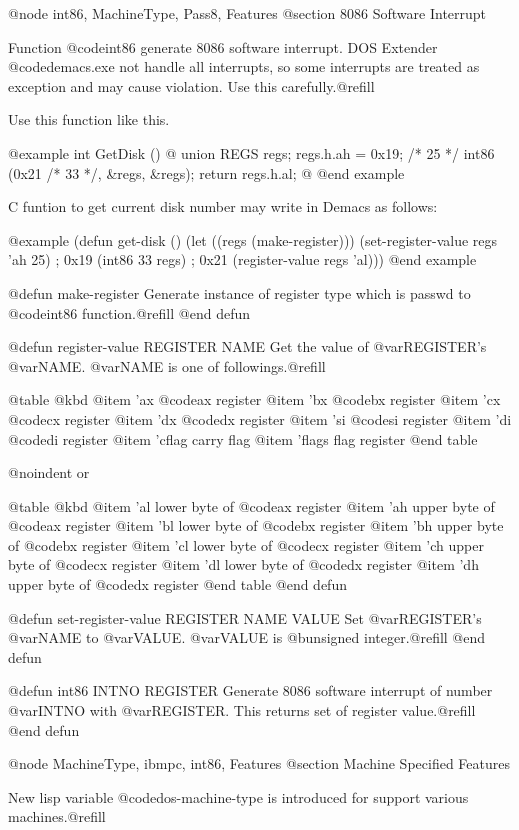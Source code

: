 @node int86, MachineType, Pass8, Features
@section 8086 Software Interrupt

Function @code{int86} generate 8086 software interrupt. DOS Extender
@code{demacs.exe} not handle all interrupts, so some interrupts are
treated as exception and may cause violation. Use this carefully.@refill

Use this function like this.

@example
int
GetDisk ()
@{
  union REGS regs;
  regs.h.ah = 0x19;     /* 25 */
  int86 (0x21 /* 33 */, &regs, &regs);
  return regs.h.al;
@}
@end example

C funtion to get current disk number may write in Demacs as follows:

@example
(defun get-disk ()
  (let ((regs (make-register)))
    (set-register-value regs 'ah 25)    ; 0x19
    (int86 33 regs)                     ; 0x21
    (register-value regs 'al)))
@end example

@defun make-register
Generate instance of register type which is passwd to @code{int86}
function.@refill
@end defun

@defun register-value REGISTER NAME
Get the value of @var{REGISTER}'s @var{NAME}. @var{NAME} is one of
followings.@refill

@table @kbd
@item 'ax
@code{ax} register
@item 'bx
@code{bx} register
@item 'cx
@code{cx} register
@item 'dx
@code{dx} register
@item 'si
@code{si} register
@item 'di
@code{di} register
@item 'cflag
carry flag
@item 'flags
flag register
@end table

@noindent
or

@table @kbd
@item 'al
lower byte of @code{ax} register
@item 'ah
upper byte of @code{ax} register
@item 'bl
lower byte of @code{bx} register
@item 'bh
upper byte of @code{bx} register
@item 'cl
lower byte of @code{cx} register
@item 'ch
upper byte of @code{cx} register
@item 'dl
lower byte of @code{dx} register
@item 'dh
upper byte of @code{dx} register
@end table
@end defun

@defun set-register-value REGISTER NAME VALUE
Set @var{REGISTER}'s @var{NAME} to @var{VALUE}. @var{VALUE} is
@b{unsigned integer}.@refill
@end defun

@defun int86 INTNO REGISTER
Generate 8086 software interrupt of number @var{INTNO} with
@var{REGISTER}. This returns set of register value.@refill
@end defun


@node MachineType, ibmpc, int86, Features
@section Machine Specified Features
	
New lisp variable @code{dos-machine-type} is introduced for support
various machines.@refill

